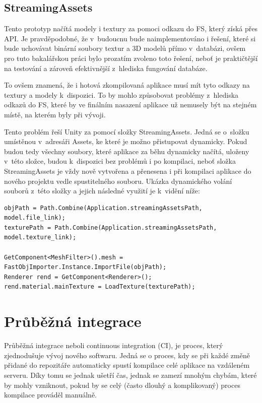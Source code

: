 \documentclass[thesis=B,czech]{FITthesis}[2012/06/26]
\begin{document}
        
    \subsection{StreamingAssets}
Tento prototyp načítá modely i textury za pomoci odkazu do FS, který získá přes API. Je pravděpodobné, že v~budoucnu bude naimplementováno i řešení, které si bude uchovávat binární soubory textur a 3D modelů přímo v~databázi, ovšem pro tuto bakalářskou práci bylo prozatím zvoleno toto řešení, neboť je praktičtější na testování a zároveň efektivnější z~hlediska fungování databáze.

To ovšem znamená, že i hotová zkompilovaná aplikace musí mít tyto odkazy na textury a modely k~dispozici. To by mohlo způsobovat problémy z~hlediska odkazů do FS, které by ve finálním nasazení aplikace už nemusely být na stejném místě, na kterém byly při vývoji.

Tento problém řeší Unity za pomocí složky StreamingAssets. Jedná se o~složku umístěnou v~adresáři Assets, ke které je možno přistupovat dynamicky. Pokud budou tedy všechny soubory, které aplikace za běhu dynamicky načítá, uloženy v~této složce, budou k~dispozici bez problémů i po kompilaci, neboť složka StreamingAssets je vždy nově vytvořena a přenesena i při kompilaci aplikace do nového projektu vedle spustitelného souboru. Ukázka dynamického volání souborů z~této složky a jejich následné využití je k~vidění níže:

\begin{minipage}[c]{0.95\textwidth}
\begin{lstlisting}[frame=single]
objPath = Path.Combine(Application.streamingAssetsPath, model.file_link);
texturePath = Path.Combine(Application.streamingAssetsPath, model.texture_link);

GetComponent<MeshFilter>().mesh = FastObjImporter.Instance.ImportFile(objPath);
Renderer rend = GetComponent<Renderer>();
rend.material.mainTexture = LoadTexture(texturePath);
\end{lstlisting}
\end{minipage}


	\section{Průběžná integrace}
	Průběžná integrace neboli continuous integration (CI), je proces, který zjednodušuje vývoj nového softwaru. Jedná se o proces, kdy se při každé změně přidané do repozitáře automaticky spustí kompilace celé aplikace na vzdáleném serveru. Díky tomu se jednak ušetří čas, jednak se zamezí mnohým chybám, které by mohly vzniknout, pokud by se celý (často dlouhý a komplikovaný) proces kompilace prováděl manuálně.
	
\end{document}
